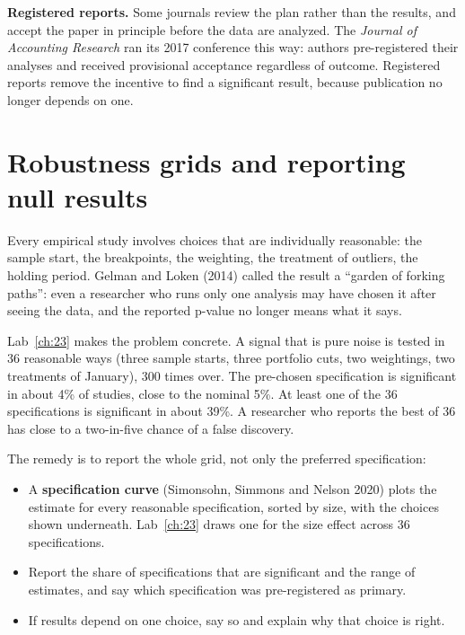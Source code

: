 \textbf{Registered reports.} Some journals review the plan rather than the results, and accept the paper in principle before the data are analyzed. The \emph{Journal of Accounting Research} ran its 2017 conference this way: authors pre-registered their analyses and received provisional acceptance regardless of outcome. Registered reports remove the incentive to find a significant result, because publication no longer depends on one.

\section{Robustness grids and reporting null results}
\label{sec:24-robust}

Every empirical study involves choices that are individually reasonable: the sample start, the breakpoints, the weighting, the treatment of outliers, the holding period. Gelman and Loken (2014) called the result a ``garden of forking paths'': even a researcher who runs only one analysis may have chosen it after seeing the data, and the reported p-value no longer means what it says.

Lab~\ref{ch:23} makes the problem concrete. A signal that is pure noise is tested in 36 reasonable ways (three sample starts, three portfolio cuts, two weightings, two treatments of January), 300 times over. The pre-chosen specification is significant in about 4\% of studies, close to the nominal 5\%. At least one of the 36 specifications is significant in about 39\%. A researcher who reports the best of 36 has close to a two-in-five chance of a false discovery.

The remedy is to report the whole grid, not only the preferred specification:

\begin{itemize}
  \item A \textbf{specification curve} (Simonsohn, Simmons and Nelson 2020) plots the estimate for every reasonable specification, sorted by size, with the choices shown underneath. Lab~\ref{ch:23} draws one for the size effect across 36 specifications.
  \item Report the share of specifications that are significant and the range of estimates, and say which specification was pre-registered as primary.
  \item If results depend on one choice, say so and explain why that choice is right.
\end{itemize}

